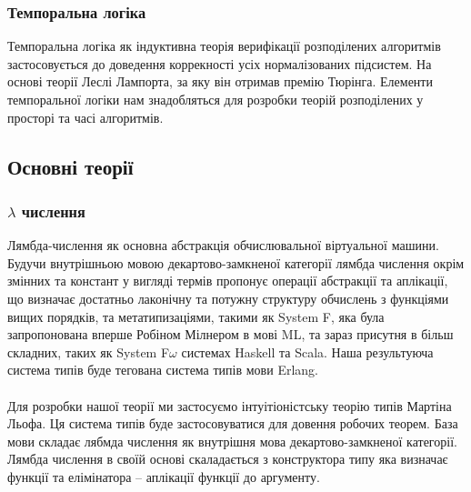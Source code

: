 \documentclass[11pt,oneside]{article}
\begin{document}
   \subsubsection{Темпоральна логіка}
   Темпоральна логіка як індуктивна теорія верифікації розподілених алгоритмів
   застосовується до доведення коррекності усіх нормалізованих підсистем. На основі
   теорії  Леслі Лампорта\cite{tla}, за яку він отримав премію Тюрінга.
   Елементи темпоральної логіки нам знадобляться для розробки теорій
   розподілених у просторі та часі алгоритмів.\\

\newpage
\subsection{Основні теорії}
\vspace{0.3cm}

   \subsubsection{$\lambda$ числення}
   Лямбда-числення як основна абстракція обчислювальної віртуальної машини.
   Будучи внутрішньою мовою декартово-замкненої категорії лямбда числення окрім змінних
   та констант у вигляді термів пропонує операції абстракції та аплікації, що визначає
   достатньо лаконічну та потужну структуру обчислень з функціями вищих порядків,
   та метатипизаціями, такими як System F, яка була запропонована
   вперше Робіном Мілнером в мові ML, та зараз присутня в більш складних,
   таких як System F$\omega$ системах Haskell та Scala. Наша результуюча система
   типів буде тегована система типів мови Erlang.

\paragraph{}
Для розробки нашої теорії ми застосуємо інтуітіоністську теорію типів Мартіна Льофа.
Ця система типів буде застосовуватися для довення робочих теорем. База мови складає
лябмда числення як внутрішня мова декартово-замкненої категорії. Лямбда числення в своїй
основі скаладається з конструктора типу яка визначає функції та елімінатора -- аплікації
функції до аргументу.

\begingroup
\parbox[t][][l]{0.40\textwidth}{

\begin{prooftree}
\end{prooftree}

}
\hspace{0.1cm}
\parbox[t][][r]{0.60\textwidth}{

\begin{prooftree}
\end{prooftree}

}
\endgroup
\end{document}
